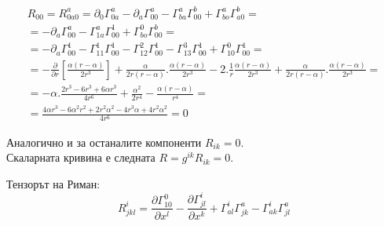 \documentclass[a4paper,12pt]{article}
\begin{document}
    \begin{equation*}
        \begin{aligned}
            R_{00}=R^a_{0a0} = \partial_0\varGamma^a_{0a} - \partial_a\varGamma^a_{00}-\varGamma^a_{ba}\varGamma^b_{00}+\varGamma^a_{bo}\varGamma^b_{a0}=\\
            = - \partial_a\varGamma^a_{00} - \varGamma^a_{1a}\varGamma^1_{00}+\varGamma^0_{bo}\varGamma^b_{00} =\\
            = -\partial_a\varGamma^1_{00}-\varGamma^1_{11}\varGamma^1_{00}-\varGamma^2_{12}\varGamma^1_{00}-\varGamma^3_{13}\varGamma^1_{00}+\varGamma^0_{10}\varGamma^1_{00} = \\
            =- \frac{\partial}{\partial r}\left[ \frac{\alpha(r-\alpha)}{2r^3} \right] + \frac{\alpha}{2r(r-\alpha)}.\frac{\alpha(r-\alpha)}{2r^3}-2.\frac{1}{r}\frac{\alpha(r-\alpha)}{2r^3}
            + \frac{\alpha}{2r(r-\alpha)}.\frac{\alpha(r-\alpha)}{2r^3} = \\
            = -\alpha.\frac{2r^3 - 6r^3+6\alpha r^3}{4r^6} + \frac{\alpha^2}{2r^4} - \frac{\alpha(r-\alpha)}{r^4} = \\
            = \frac{4\alpha r^3 - 6 \alpha^2 r^2 + 2r^2\alpha^2-4r^3\alpha+4r^2\alpha^2}{4r^6} = 0
        \end{aligned}
    \end{equation*}

    Аналогично и за останалите компоненти $R_{ik}=0$.\\
    Скаларната кривина е следната $R=g^{ik}R_{ik}=0$.

    Тензорът на Риман: 
    \begin{equation*}
        R^i_{jkl}=\frac{\partial\varGamma^0_{10}}{\partial x^l} - \frac{\partial \varGamma^i_{jl}}{\partial x^k} + \varGamma^i_{al}\varGamma^a_{jk}-\varGamma^i_{ak}\varGamma^a_{jl}
    \end{equation*}
\end{document}
